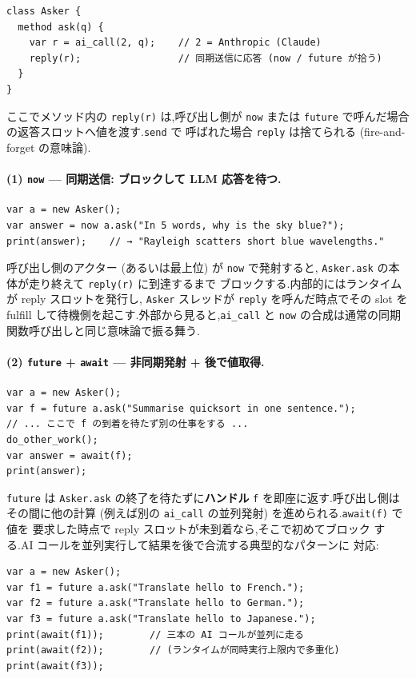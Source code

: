 \documentclass[11pt,a4paper]{article}
\newcommand{\code}[1]{\texttt{\small #1}}
\begin{document}
\begin{lstlisting}
class Asker {
  method ask(q) {
    var r = ai_call(2, q);    // 2 = Anthropic (Claude)
    reply(r);                 // 同期送信に応答 (now / future が拾う)
  }
}
\end{lstlisting}

ここでメソッド内の \code{reply(r)} は,呼び出し側が \code{now} または
\code{future} で呼んだ場合の返答スロットへ値を渡す.\code{send} で
呼ばれた場合 \code{reply} は捨てられる (fire-and-forget の意味論).

\paragraph{(1) \code{now} — 同期送信: ブロックして LLM 応答を待つ.}

\begin{lstlisting}
var a = new Asker();
var answer = now a.ask("In 5 words, why is the sky blue?");
print(answer);    // → "Rayleigh scatters short blue wavelengths."
\end{lstlisting}

呼び出し側のアクター (あるいは最上位) が \code{now} で発射すると,
\code{Asker.ask} の本体が走り終えて \code{reply(r)} に到達するまで
ブロックする.内部的にはランタイムが reply スロットを発行し,
\code{Asker} スレッドが \code{reply} を呼んだ時点でその slot を
fulfill して待機側を起こす.外部から見ると,\code{ai\_call} と
\code{now} の合成は通常の同期関数呼び出しと同じ意味論で振る舞う.

\paragraph{(2) \code{future} + \code{await} — 非同期発射 + 後で値取得.}

\begin{lstlisting}
var a = new Asker();
var f = future a.ask("Summarise quicksort in one sentence.");
// ... ここで f の到着を待たず別の仕事をする ...
do_other_work();
var answer = await(f);
print(answer);
\end{lstlisting}

\code{future} は \code{Asker.ask} の終了を待たずに\textbf{ハンドル}
\code{f} を即座に返す.呼び出し側はその間に他の計算 (例えば別の
\code{ai\_call} の並列発射) を進められる.\code{await(f)} で値を
要求した時点で reply スロットが未到着なら,そこで初めてブロック
する.AI コールを並列実行して結果を後で合流する典型的なパターンに
対応:

\begin{lstlisting}
var a = new Asker();
var f1 = future a.ask("Translate hello to French.");
var f2 = future a.ask("Translate hello to German.");
var f3 = future a.ask("Translate hello to Japanese.");
print(await(f1));        // 三本の AI コールが並列に走る
print(await(f2));        // (ランタイムが同時実行上限内で多重化)
print(await(f3));
\end{lstlisting}
\end{document}
